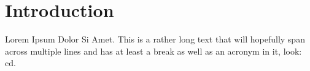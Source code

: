 \chapter{Introduction}

Lorem Ipsum Dolor Si Amet.
This is a rather long text that will hopefully span across multiple lines and has at least a break as well as an acronym in it, look: \ac{cd}.
